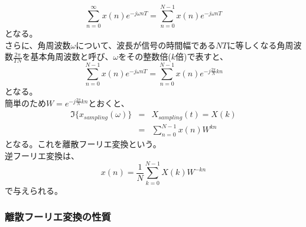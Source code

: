 \documentclass[a4paper]{jsarticle}
\begin{document}
\begin{equation}
\sum _{ n = 0 } ^{ \infty } x \left( n \right) e ^ { -j \omega nT } = \sum _{ n = 0 } ^{ N - 1 } x \left( n \right) e ^ { -j \omega nT }
\end{equation}
となる。\\
さらに、角周波数$\omega$について、波長が信号の時間幅である$NT$に等しくなる角周波数$\frac { 2 \pi } { TN }$を基本角周波数と呼び、$\omega$をその整数倍($k$倍)で表すと、
\begin{equation}
\sum _{ n = 0 } ^{ N - 1 } x \left( n \right) e ^ { -j \omega nT } = \sum _{ n = 0 } ^{ N - 1 } x \left( n \right) e ^ { -j \frac { 2 \pi } { N } kn }
\end{equation}
となる。\\
簡単のため$W = e ^{ -j \frac { 2 \pi } { N } kn}$とおくと、
\begin{eqnarray}
	\mathfrak{I} \bigl\{ x_{sampling} \left( \omega \right) \bigr\} &=& X_{sampling} \left( t \right) \nonumber = X \left( k \right) \\
	&=& \sum _{ n = 0 } ^{ N - 1 } x \left( n \right) W ^{ kn }
\end{eqnarray}
となる。これを離散フーリエ変換という。\\
逆フーリエ変換は、
\begin{equation}
	x \left( n \right) = \frac { 1 } { N } \sum _{ k = 0 } ^{ N - 1 } X \left( k \right) W ^ { -kn }
\end{equation}
で与えられる。\\
\subsubsection{離散フーリエ変換の性質}
\end{document}
